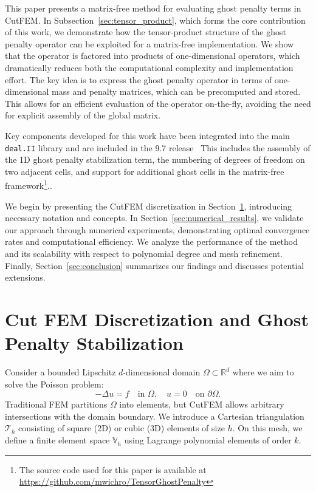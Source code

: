 \documentclass[11pt,a4paper]{article}
\begin{document}
This paper presents a matrix-free method for evaluating ghost penalty terms in CutFEM. In
Subsection~\ref{sec:tensor_product}, which forms the core contribution of this work, we demonstrate how the
tensor-product structure of the ghost penalty operator can be exploited for a matrix-free implementation. We show that
the operator is factored into products of one-dimensional operators, which dramatically reduces both the computational
complexity and implementation effort. The key idea is to express the ghost penalty operator in terms of one-dimensional
mass and penalty matrices, which can be precomputed and stored. This allows for an efficient evaluation of the operator
on-the-fly, avoiding the need for explicit assembly of the global matrix.

Key components developed for this work have been integrated into the main \texttt{deal.II} library and are included in
the 9.7 release~\cite{dealII97} This includes the assembly of the 1D ghost penalty stabilization term, the numbering of
degrees of freedom on two adjacent cells, and support for additional ghost cells in the matrix-free
framework\footnote{The source code used for this paper is available at
    \url{https://github.com/mwichro/TensorGhostPenalty}}..

We begin by presenting the CutFEM discretization in Section~\ref{sec:cutFEM}, introducing necessary notation and
concepts. In Section~\ref{sec:numerical_results}, we validate our approach through numerical experiments, demonstrating
optimal convergence rates and computational efficiency. We analyze the performance of the method and its scalability
with respect to polynomial degree and mesh refinement. Finally, Section~\ref{sec:conclusion} summarizes our findings
and discusses potential extensions.

\section{Cut FEM Discretization and Ghost Penalty Stabilization}
\label{sec:cutFEM}
Consider a bounded Lipschitz $d$-dimensional domain $\Omega \subset \mathbb{R}^d$ where we aim to solve the Poisson
problem:
\begin{equation}
    - \Delta u = f \quad \text{in } \Omega,
    \quad u = 0 \quad \text{on } \partial\Omega.
\end{equation}
Traditional FEM partitions $\Omega$ into elements, but CutFEM allows arbitrary intersections with the domain
boundary.
We introduce a Cartesian triangulation \( \mathcal{T}_h \) consisting of square (2D) or cubic (3D) elements of size
$h$. On this mesh, we define a finite element space $\mathbb{V}_h$ using Lagrange polynomial elements of order \( k
\).
\end{document}
